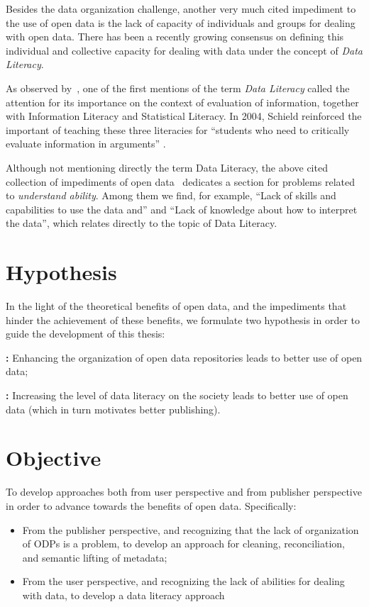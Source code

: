 Besides the data organization challenge, another very much cited impediment to the use of open data is the lack of capacity of individuals and groups for dealing with open data.
There has been a recently growing consensus on defining this individual and collective capacity for dealing with data under the concept of \emph{Data Literacy}.

As observed by~, one of the first mentions of the term \emph{Data Literacy} called the attention for its importance on the context of evaluation of information, together with  Information Literacy and Statistical Literacy. 
In 2004, Schield reinforced the important of teaching these three literacies for ``students who need to critically evaluate information in arguments'' \cite{Schield2004}.

Although not mentioning directly the term Data Literacy, the above cited collection of impediments of open data~\cite{Zuiderwijk2012} dedicates a section for problems related to \emph{understand ability}.
Among them we find, for example, ``Lack of skills and capabilities to use the data and'' and ``Lack of knowledge about how to interpret the data'', which relates directly to the topic of Data Literacy.

\section{Hypothesis}

In the light of the theoretical benefits of open data, and the impediments that hinder the achievement of these benefits, we formulate two hypothesis in order to guide the development of this thesis:

\noindent\textbf{:} Enhancing the organization of open data repositories leads to better use of open data;

\noindent\textbf{:} Increasing the level of data literacy on the society leads to better use of open data (which in turn motivates better publishing).

\section{Objective}

To develop approaches both from user perspective and from publisher perspective in order to advance towards the benefits of open data. Specifically:
\begin{itemize}
	\item From the publisher perspective, and recognizing that the lack of organization of ODPs is a problem, to develop an approach for cleaning, reconciliation, and semantic lifting of metadata;
	\item From the user perspective, and recognizing the lack of abilities for dealing with data, to develop a data literacy approach
\end{itemize}

